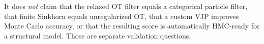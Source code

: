 It does \emph{not} claim that the relaxed OT filter equals a categorical
particle filter, that finite Sinkhorn equals unregularized OT, that a custom VJP
improves Monte Carlo accuracy, or that the resulting score is automatically
HMC-ready for a structural model.  Those are separate validation questions.

\FloatBarrier
